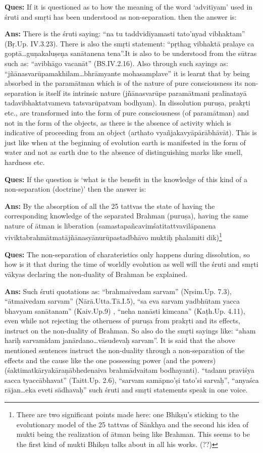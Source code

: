 \textbf{Ques:} If it is questioned as to how the meaning of the word ‘advitīyam’ used in śruti and smṛti has been understood as non-separation. then the answer is: 

\textbf{Ans:} There is the śruti saying: “na tu taddvidīyamasti tato’nyad vibhaktam” (Bṛ.Up. IV.3.23). There is also the smṛti statement: “pṛthag vibhaktā pralaye ca goptā…guṇakaluṣeṇa sanātanena tena”.It is also to be understood from the sūtras such as: “avibhāgo vacanāt” (BS.IV.2.16). Also through such sayings as: “jñānasvarūpamakhilam…bhrāmyante mohasamplave” it is learnt that by being absorbed in the paramātman which is of the nature of pure consciousness its non-separation is itself its intrinsic nature (jñānasvarūpe paramātmani pralīnatayā tadavibhaktatvameva tatsvarūpatvam bodhyam). In dissolution puruṣa, prakṛti etc., are transformed into the form of pure consciousness (of paramātman) and not in the form of the objects, as there is the absence of activity which is indicative of proceeding from an object (arthato vyañjakavyāpārābhāvāt). This is just like when at the beginning of evolution earth is manifested in the form of water and not as earth due to the absence of distinguishing marks like smell, hardness etc. 

\textbf{Ques:} If the question is ‘what is the benefit in the knowledge of this kind of a non-separation (doctrine)’ then the answer is: 

\textbf{Ans:} By the absorption of all the 25 tattvas the state of having the corresponding knowledge of the separated Brahman (puruṣa), having the same nature of ātman is liberation (samastapañcavimśatitattvavilāpanena viviktabrahmātmatājñānasyānurūpastadbhāvo muktiḥ phalamiti dik)\footnote{There are two significant points made here: one Bhikṣu’s sticking to the evolutionary model of the 25 tattvas of Sānkhya and the second his idea of mukti being the realization of ātman being like Brahman. This seems to be the first kind of mukti Bhikṣu talks about in all his works. (??)}

\textbf{Ques:} The non-separation of charateristics only happens during dissolution, so how is it that during the time of worldly evolution as well will the śruti and smṛti vākyas declaring the non-duality of Brahman be explained. 

\textbf{Ans:} Such śruti quotations as: “brahmaivedam sarvam” (Nṛsim.Up. 7.3), “ātmaivedam sarvam” (Nārā.Utta.Tā.I.5), “sa eva sarvam yadbhūtam yacca bhavyam sanātanam” (Kaiv.Up.9) , “neha nanāsti kimcana” (Kaṭh.Up. 4.11), even while not rejecting the otherness of puruṣa from prakṛti and its effects, instruct on the non-duality of Brahman. So also do the smṛti sayings like: “aham hariḥ sarvamidam janārdano…vāsudevaḥ sarvam”. It is said that the above mentioned sentences instruct the non-duality through a non-separation of the effects and the cause like the one possessing power (and the powers) (śaktimatkāryakāraṇābhedenaiva brahmādvaitam bodhayanti). “tadanu praviśya sacca tyaccābhavat” (Taitt.Up. 2.6), “sarvam samāpno’ṣi tato’si sarvaḥ”, “anyaśca rājan…eka eveti sādhavaḥ” such śruti and smṛti statements speak in one voice.

